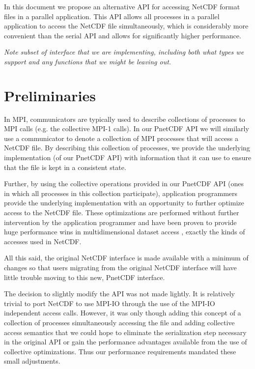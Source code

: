 \documentclass[10pt]{article}
\begin{document}
In this document we propose an alternative API for accessing NetCDF format
files in a parallel application.  This API allows all processes in a parallel
application to access the NetCDF file simultaneously, which is considerably
more convenient than the serial API and allows for significantly higher
performance.

\emph{Note subset of interface that we are implementing, including both what
types we support and any functions that we might be leaving out.}

\section{Preliminaries}

In MPI, communicators are typically used to describe collections of processes
to MPI calls (e.g. the collective MPI-1 calls).  In our PnetCDF API we
will similarly use a communicator to denote a collection of MPI processes that
will access a NetCDF file.  By describing this collection of processes, we
provide the underlying implementation (of our PnetCDF API) with
information that it can use to ensure that the file is kept in a consistent
state.

Further, by using the collective operations provided in our PnetCDF
API (ones in which all processes in this collection participate), application
programmers provide the underlying implementation with an opportunity to
further optimize access to the NetCDF file.  These optimizations are performed
without further intervention by the application programmer and have been
proven to provide huge performance wins in multidimensional dataset access \cite{thakur:romio},
exactly the kinds of accesses used in NetCDF.

All this said, the original NetCDF interface is made available with a minimum
of changes so that users migrating from the original NetCDF interface will
have little trouble moving to this new, PnetCDF interface.

The decision to slightly modify the API was not made lightly.  It is
relatively trivial to port NetCDF to use MPI-IO through the use of the MPI-IO
independent access calls.  However, it was only though adding this concept of
a collection of processes simultaneously accessing the file and adding
collective access semantics that we could hope to eliminate the serialization
step necessary in the original API or gain the performance advantages
available from the use of collective optimizations.  Thus our performance
requirements mandated these small adjustments.
\end{document}
